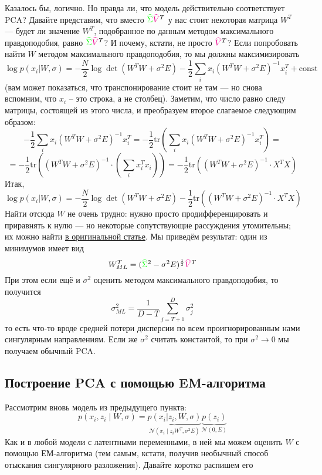 \documentclass{amsart}
\theoremstyle{definition}
\theoremstyle{remark}
\numberwithin{equation}{section}
\begin{document}
Казалось бы, логично. Но правда ли, что модель действительно соответствует PCA? Давайте представим, что вместо $\textcolor{green}{\widehat{\Sigma}}\textcolor{magenta}{\widehat{V}}^T$ у нас стоит некоторая матрица $W^T$ --- будет ли значение $W^T$, подобранное по данным методом максимального правдоподобия, равно $\textcolor{green}{\widehat{\Sigma}}\textcolor{magenta}{\widehat{V}}^T$? И почему, кстати, не просто $\textcolor{magenta}{\widehat{V}}^T$? Если попробовать найти $W$ методом максимального правдоподобия, то мы должны максимизировать
$$\log{p(x_i|W,\sigma)} = -\frac{N}2\log{\det(W^TW + \sigma^2E)} -\frac12\sum_ix_i(W^TW + \sigma^2E)^{-1}x_i^T + \mathrm{const}$$
(вам может показаться, что транспонирование стоит не там --- но снова вспомним, что $x_i$ -- это строка, а не столбец). Заметим, что число равно следу матрицы, состоящей из этого числа, и преобразуем второе слагаемое следующим образом:
$$-\frac12\sum_ix_i(W^TW + \sigma^2E)^{-1}x_i^T = -\frac12\mathrm{tr}\left(\sum_ix_i(W^TW + \sigma^2E)^{-1}x_i^T\right) = $$
$$=-\frac12\mathrm{tr}\left((W^TW + \sigma^2E)^{-1}\cdot\left(\sum_ix_i^Tx_i\right)\right) = -\frac12\mathrm{tr}\left((W^TW + \sigma^2E)^{-1}\cdot X^TX\right)$$
Итак,
$$\log{p(x_i|W,\sigma)} = -\frac{N}2\log{\det(W^TW + \sigma^2E)}  -\frac12\mathrm{tr}\left((W^TW + \sigma^2E)^{-1}\cdot X^TX\right)$$
Найти отсюда $W$ не очень трудно: нужно просто продифференцировать и приравнять к нулю --- но некоторые сопутствующие рассуждения утомительны; их можно найти \href{https://www.di.ens.fr/~fbach/courses/fall2010/Bishop_Tipping_1999_Probabilistic_PCA.pdf}{в оригинальной статье}. Мы приведём результат: один из минимумов имеет вид
$$W_{ML}^T = (\textcolor{green}{\widehat{\Sigma}}^2 - \sigma^2E)^{\frac12}\textcolor{magenta}{\widehat{V}}^T$$
При этом если ещё и $\sigma^2$ оценить методом максимального правдоподобия, то получится
$$\sigma^2_{ML} = \frac1{D-T}\sum\limits_{j=T+1}^D\sigma^2_j$$
то есть что-то вроде средней потери дисперсии по всем проигнорированным нами сингулярным направлениям. Если же $\sigma^2$ считать константой, то при $\sigma^2\rightarrow0$ мы получаем обычный PCA.

\subsection{Построение PCA с помощью EM-алгоритма} Рассмотрим вновь модель из предыдущего пункта:
$$p(x_i,z_i\mid W,\sigma) = \underbrace{p(x_i|z_i, W, \sigma)}_{\mathcal{N}(x_i\mid z_iW^T, \sigma^2E)}\underbrace{p(z_i)}_{\mathcal{N}(0, E)}$$
Как и в любой модели с латентными переменными, в ней мы можем оценить $W$ с помощью ЕМ-алгоритма (тем самым, кстати, получив необычный способ отыскания сингулярного разложения). Давайте коротко распишем его
\end{document}
